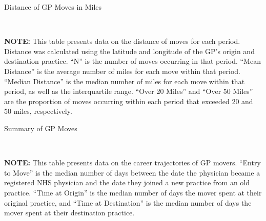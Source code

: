 \documentclass[11pt]{article}
\begin{document}
\begin{table}[htbp]
\caption{Distance of GP Moves in Miles}
  \begin{threeparttable}
  \\
  \begin{tablenotes}
  \footnotesize
  \textbf{NOTE:} This table presents data on the distance of moves for each period. Distance was calculated using the latitude and longitude of the GP's origin and destination practice. ``N'' is the number of moves occurring in that period. ``Mean Distance'' is the average number of miles for each move within that period. ``Median Distance'' is the median number of miles for each move within that period, as well as the interquartile range. ``Over 20 Miles'' and ``Over 50 Miles'' are the proportion of moves occurring within each period that exceeded 20 and 50 miles, respectively.
  \end{tablenotes}
  \end{threeparttable}
  \label{tab:allmovesdistance}
\end{table}

\begin{landscape}
  \begin{table}[ht]
  \caption{Summary of GP Moves}
    \begin{threeparttable}
    \\
    \begin{tablenotes}
    \footnotesize
    \textbf{NOTE:} This table presents data on the career trajectories of GP movers. ``Entry to Move'' is the median number of days between the date the physician became a registered NHS physician and the date they joined a new practice from an old practice. ``Time at Origin'' is the median number of days the mover spent at their original practice, and ``Time at Destination'' is the median number of days the mover spent at their destination practice.
    \end{tablenotes}
    \end{threeparttable}
    \label{tab:allmovessummary}
  \end{table}
\end{landscape}
\end{document}
